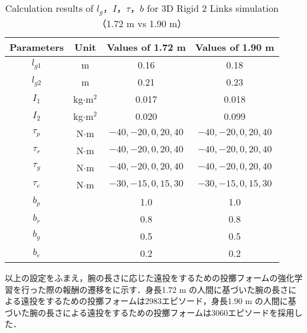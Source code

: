 \begin{table}[tb]
  \begin{center}
    \caption{Calculation results of $l_{g}$，$I$，$\tau$，$b$ for 3D Rigid 2 Links simulation （1.72 m vs 1.90 m）}
    \begin{tabular}{c|c|c|c}
      \hline
      Parameters & Unit & Values of 1.72 m & Values of 1.90 m \\
      \hline
      $l_{g1}$ & m & 0.16 & 0.18 \\
      $l_{g2}$ & m & 0.21 & 0.23 \\
      $I_{1}$ & kg$\cdot$$\mathrm{m}^2$ & 0.017 & 0.018 \\
      $I_{2}$ & kg$\cdot$$\mathrm{m}^2$ & 0.020 & 0.099 \\
      $\tau_{p}$ & N$\cdot$m & $-40, -20, 0, 20, 40$ & $-40, -20, 0, 20, 40$ \\
      $\tau_{r}$ & N$\cdot$m & $-40, -20, 0, 20, 40$ & $-40, -20, 0, 20, 40$ \\
      $\tau_{y}$ & N$\cdot$m & $-40, -20, 0, 20, 40$ & $-40, -20, 0, 20, 40$ \\
      $\tau_{e}$ & N$\cdot$m & $-30, -15, 0, 15, 30$ & $-30, -15, 0, 15, 30$ \\
      $b_{p}$ &  & 1.0 & 1.0\\
      $b_{r}$ &  & 0.8 & 0.8\\
      $b_{y}$ &  & 0.5 & 0.5\\
      $b_{e}$ &  & 0.2 & 0.2\\
      \hline
    \end{tabular}
  \end{center}
\end{table}

以上の設定をふまえ，腕の長さに応じた遠投をするための投擲フォームの強化学習を行った際の報酬の遷移をに示す．身長1.72 m の人間に基づいた腕の長さによる遠投をするための投擲フォームは2983エピソード，身長1.90 m の人間に基づいた腕の長さによる遠投をするための投擲フォームは3060エピソードを採用した．


